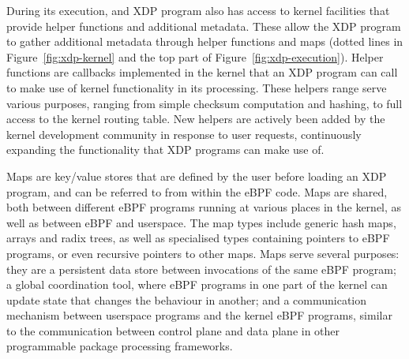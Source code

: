 \documentclass[10pt,sigconf]{acmart}
\begin{document}
During its execution, and XDP program also has access to kernel facilities that
provide helper functions and additional metadata. These allow the XDP program to
gather additional metadata through helper functions and maps (dotted lines in
Figure~\ref{fig:xdp-kernel} and the top part of Figure~\ref{fig:xdp-execution}).
%
%
%
%
Helper functions are callbacks implemented in the kernel that an XDP program can
call to make use of kernel functionality in its processing. These helpers range
serve various purposes, ranging from simple checksum computation and hashing, to
full access to the kernel routing table. New helpers are actively been added by
the kernel development community in response to user requests, continuously
expanding the functionality that XDP programs can make use of.

Maps are key/value stores that are defined by the user before loading an XDP
program, and can be referred to from within the eBPF code. Maps are shared, both
between different eBPF programs running at various places in the kernel, as well
as between eBPF and userspace. The map types include generic hash maps, arrays
and radix trees, as well as specialised types containing pointers to eBPF
programs, or even recursive pointers to other maps. Maps serve several purposes:
they are a persistent data store between invocations of the same eBPF program; a
global coordination tool, where eBPF programs in one part of the kernel can
update state that changes the behaviour in another; and a communication
mechanism between userspace programs and the kernel eBPF programs, similar to
the communication between control plane and data plane in other programmable
package processing frameworks.
\end{document}
